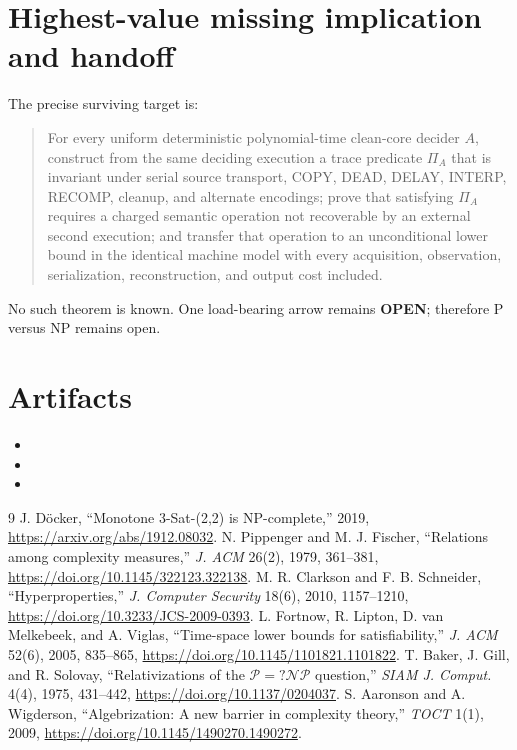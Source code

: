 \documentclass[11pt]{article}
\newcommand{\OPEN}{\textbf{OPEN}}
\begin{document}
\section{Highest-value missing implication and handoff}

The precise surviving target is:
\begin{quote}
For every uniform deterministic polynomial-time clean-core decider $A$,
construct from the same deciding execution a trace predicate $\Pi_A$ that is
invariant under serial source transport, COPY, DEAD, DELAY, INTERP, RECOMP,
cleanup, and alternate encodings; prove that satisfying $\Pi_A$ requires a
charged semantic operation not recoverable by an external second execution;
and transfer that operation to an unconditional lower bound in the identical
machine model with every acquisition, observation, serialization,
reconstruction, and output cost included.
\end{quote}
No such theorem is known.  One load-bearing arrow remains \OPEN; therefore P
versus NP remains open.

\section{Artifacts}

\begin{itemize}
\item {}
\item {}
\item {}
\end{itemize}

\begin{thebibliography}{9}
 J. D\"ocker, ``Monotone 3-Sat-(2,2) is NP-complete,'' 2019,
\url{https://arxiv.org/abs/1912.08032}.
 N. Pippenger and M. J. Fischer, ``Relations among complexity
measures,'' \emph{J. ACM} 26(2), 1979, 361--381,
\url{https://doi.org/10.1145/322123.322138}.
 M. R. Clarkson and F. B. Schneider, ``Hyperproperties,''
\emph{J. Computer Security} 18(6), 2010, 1157--1210,
\url{https://doi.org/10.3233/JCS-2009-0393}.
 L. Fortnow, R. Lipton, D. van Melkebeek, and A. Viglas,
``Time-space lower bounds for satisfiability,'' \emph{J. ACM} 52(6), 2005,
835--865, \url{https://doi.org/10.1145/1101821.1101822}.
 T. Baker, J. Gill, and R. Solovay, ``Relativizations of the
$\mathcal P=?\mathcal{NP}$ question,'' \emph{SIAM J. Comput.} 4(4), 1975,
431--442, \url{https://doi.org/10.1137/0204037}.
 S. Aaronson and A. Wigderson, ``Algebrization: A new barrier in
complexity theory,'' \emph{TOCT} 1(1), 2009,
\url{https://doi.org/10.1145/1490270.1490272}.
\end{thebibliography}

\end{document}

